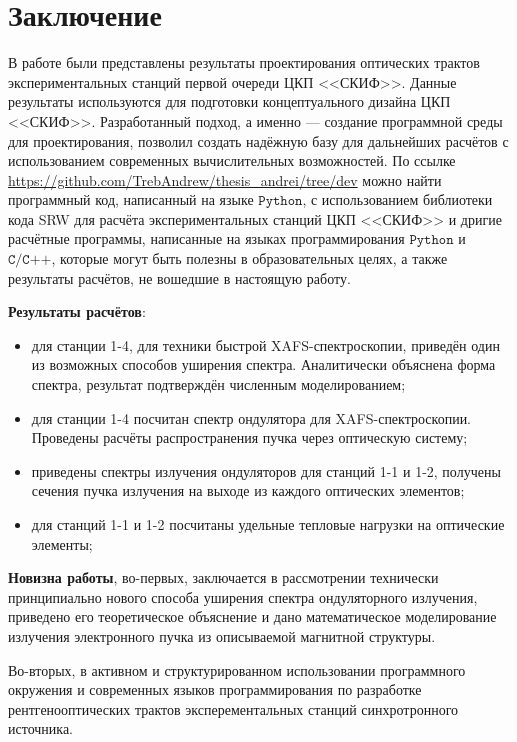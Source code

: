 \chapter*{Заключение}
В работе были представлены результаты проектирования оптических трактов экспериментальных станций первой очереди ЦКП <<СКИФ>>. Данные результаты используются для подготовки концептуального дизайна ЦКП <<СКИФ>>. Разработанный подход, а именно --- создание программной среды для проектирования, позволил создать надёжную базу для дальнейших расчётов с использованием современных вычислительных возможностей. По ссылке  \url{https://github.com/TrebAndrew/thesis_andrei/tree/dev} можно найти программный код, написанный на языке $\texttt{Python}$, с использованием библиотеки кода SRW для расчёта экспериментальных станций ЦКП <<СКИФ>> и дригие расчётные программы, написанные на языках программирования $\texttt{Python}$ и $\texttt{C/C++}$, которые могут быть полезны в образовательных целях, а также результаты расчётов, не вошедшие в настоящую работу.

\textbf{Результаты расчётов}: 
\begin{itemize}
	\item для станции 1-4, для техники быстрой XAFS-спектроскопии, приведён один из возможных способов уширения спектра. Аналитически объяснена форма спектра, результат подтверждён численным моделированием;
	\item для станции 1-4 посчитан спектр ондулятора для XAFS-спектроскопии. Проведены расчёты распространения пучка через оптическую систему;
	\item приведены спектры излучения ондуляторов для станций 1-1 и 1-2, получены сечения пучка излучения на выходе из каждого оптических элементов;
	\item для станций 1-1 и 1-2 посчитаны удельные тепловые нагрузки на оптические элементы;
\end{itemize}

\textbf{Новизна работы}, во-первых, заключается в рассмотрении технически принципиально нового способа уширения спектра ондуляторного излучения, приведено его теоретическое объяснение и дано математическое моделирование излучения электронного пучка из описываемой магнитной структуры.

Во-вторых, в активном и структурированном использовании программного окружения и современных языков программирования по разработке рентгенооптических трактов эксперементальных станций синхротронного источника.

